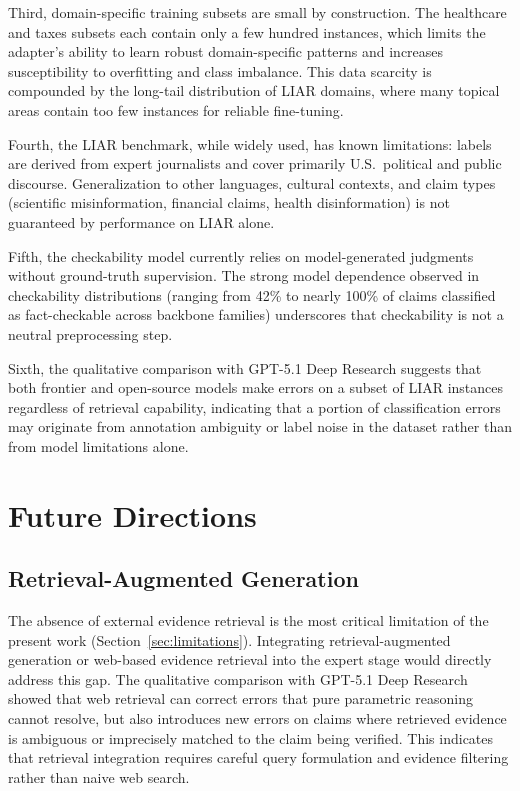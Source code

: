 Third, domain-specific training subsets are small by construction. The healthcare and taxes subsets each contain only a few hundred instances, which limits the adapter's ability to learn robust domain-specific patterns and increases susceptibility to overfitting and class imbalance. This data scarcity is compounded by the long-tail distribution of LIAR domains, where many topical areas contain too few instances for reliable fine-tuning.

Fourth, the LIAR benchmark, while widely used, has known limitations: labels are derived from expert journalists and cover primarily U.S.\ political and public discourse. Generalization to other languages, cultural contexts, and claim types (scientific misinformation, financial claims, health disinformation) is not guaranteed by performance on LIAR alone.

Fifth, the checkability model currently relies on model-generated judgments without ground-truth supervision. The strong model dependence observed in checkability distributions (ranging from 
42\% to nearly 100\% of claims classified as fact-checkable across backbone families) underscores that checkability is not a neutral preprocessing step.

Sixth, the qualitative comparison with GPT-5.1 Deep Research suggests that both frontier and open-source models make errors on a subset of LIAR instances regardless of retrieval capability, 
indicating that a portion of classification errors may originate from annotation ambiguity or label noise in the dataset rather than from model limitations alone.

\section{Future Directions}
\label{sec:future}

\subsection{Retrieval-Augmented Generation}
The absence of external evidence retrieval is the most critical limitation of the present work (Section~\ref{sec:limitations}). 
Integrating retrieval-augmented generation or web-based evidence retrieval into the expert stage would directly address this gap. 
The qualitative comparison with GPT-5.1 Deep Research showed that web retrieval can correct errors that pure parametric reasoning 
cannot resolve, but also introduces new errors on claims where retrieved evidence is ambiguous or imprecisely matched to the claim 
being verified. This indicates that retrieval integration requires careful query formulation and evidence filtering rather than naive web search.

